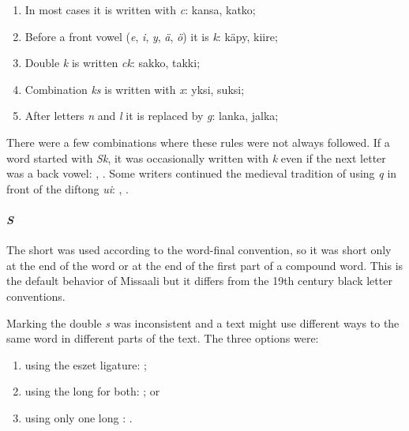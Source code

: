 \documentclass[a4paper, 12pt]{article}
\begin{document}
\begin{enumerate}
\item In most cases it is written with \emph{c}:
  {kansa}, {katko};

\item Before a front vowel (\emph{e}, \emph{i}, \emph{y}, \emph{ä},
  \emph{ö}) it is \emph{k}: { käpy},
  { kiire};

\item Double \emph{k} is written \emph{ck}: { sakko},
  { takki};

\item Combination \emph{ks} is written with \emph{x}:
  { yksi}, { suksi};

\item After letters \emph{n} and \emph{l} it is replaced by \emph{g}:
  { lanka}, { jalka};

\end{enumerate}

There were a few combinations where these rules were not always
followed. If a word started with \emph{Sk}, it was occasionally
written with \emph{k} even if the next letter was a back vowel:
, . Some writers continued the
medieval tradition of using \emph{q} in front of the diftong
\emph{ui}: , .

\paragraph{\emph{S}} The short  was used according to the
word-final convention, so it was short only at the end of the word or
at the end of the first part of a compound word. This is the default
behavior of Missaali but it differs from the 19th century black letter
conventions. 

Marking the double \emph{s} was inconsistent and a text might use
different ways to the same word in different parts of the text. The
three options were:

\begin{enumerate}
\item using the eszet ligature: ;

\item using the long  for both: ; or

\item using only one long : .
\end{enumerate}
\end{document}
